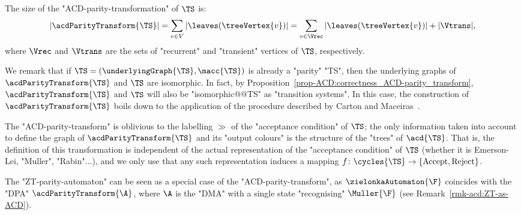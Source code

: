 \documentclass{theoretics}
\begin{document}
\begin{remark}\label{rmk-acd:size_ACD-parity-transformation}
	The size of the "ACD-parity-transformation" of $\TS$ is:
	\[|\acdParityTransform{\TS}| = \sum_{v\in V} |  \leaves(\treeVertex{v}) | = \sum_{v\in \Vrec}|  \leaves(\treeVertex{v}) | + |\Vtrans|,\]
	where $\Vrec$ and $\Vtrans$ are the sets of "recurrent" and "transient" vertices of $\TS$, respectively.
\end{remark}

\begin{remark}\label{rmk-acd:acd-transform-parity-is-parity}
	We remark that if $\TS = (\underlyingGraph{\TS}, \macc{\TS})$ is already a "parity" "TS", then the underlying graphs of $\acdParityTransform{\TS}$ and $\TS$ are isomorphic. In fact, by Proposition~\ref{prop-ACD:correctness_ACD-parity_transform}, $\acdParityTransform{\TS}$ and $\TS$ will also be "isomorphic@@TS" as "transition systems".
	In this case, the construction of $\acdParityTransform{\TS}$ boils down to the application of the procedure described by Carton and Maceiras~\cite{CartonMaceiras99RabinIndex}.
\end{remark}

\begin{remark}\label{rmk-acd:oblivious-to-representation}
	The "ACD-parity-transform" is oblivious to the labelling $\gg$ of the "acceptance condition" of $\TS$; the only information taken into account to define the graph of $\acdParityTransform{\TS}$ and its "output colours" is the structure of the "trees" of $\acd{\TS}$.
	That is, the definition of this transformation is independent of the actual representation of the "acceptance condition" of $\TS$ (whether it is Emerson-Lei, "Muller", "Rabin"...), and we only use that any such representation induces a mapping $f\colon \cycles{\TS} \to \{\mathrm{Accept}, \mathrm{Reject} \}$.
\end{remark}

\begin{remark}
	The "ZT-parity-automaton" can be seen as a special case of the "ACD-parity-transform", as $\zielonkaAutomaton{\F}$ coincides with the "DPA" $\acdParityTransform{\A}$, where $\A$ is the "DMA" with a single state "recognising" $\Muller{\F}$ (see Remark~\ref{rmk-acd:ZT-as-ACD}).
\end{remark}
\end{document}
